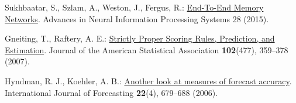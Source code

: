 Sukhbaatar, S., Szlam, A., Weston, J., Fergus, R.: \href{https://proceedings.neurips.cc/paper/2015/hash/8fb21ee7a2207526da55a679f0332de2-Abstract.html}{End-To-End Memory Networks}. Advances in Neural Information Processing Systems 28 (2015).

Gneiting, T., Raftery, A. E.: \href{https://doi.org/10.1198/016214506000001437}{Strictly Proper Scoring Rules, Prediction, and Estimation}. Journal of the American Statistical Association \textbf{102}(477), 359--378 (2007). 

Hyndman, R. J., Koehler, A. B.: \href{https://doi.org/10.1016/j.ijforecast.2006.03.001}{Another look at measures of forecast accuracy}. International Journal of Forecasting \textbf{22}(4), 679--688 (2006). 
